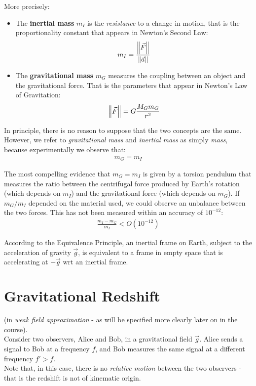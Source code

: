 \documentclass[../template.tex]{subfiles}
\begin{document}
More precisely:
\begin{itemize}
    \item The \textbf{inertial mass} $m_I$  is the \textit{resistance} to a change in motion, that is the proportionality constant that appears in Newton's Second Law:
    \begin{align*}
        m_I = \frac{\norm{\vec{F}}}{\norm{\vec{a}}}  
    \end{align*}  
    \item The \textbf{gravitational mass} $m_G$  measures the coupling between an object and the gravitational force. That is the parameters that appear in Newton's Law of Gravitation:
    \begin{align*}
        \norm{\vec{F}} = G \frac{M_G m_G}{r^2}
    \end{align*} 
\end{itemize}
In principle, there is no reason to suppose that the two concepts are the same. However, we refer to \textit{gravitational mass} and \textit{inertial mass} as simply \textit{mass}, because experimentally we observe that:
\begin{align*}
    m_G = m_I
\end{align*}   

The most compelling evidence that $m_G = m_I$ is given by a torsion pendulum that measures the ratio between the centrifugal force produced by Earth's rotation (which depends on $m_I$) and the gravitational force (which depends on $m_G$). If $m_G/m_I$ depended on the material used, we could observe an unbalance between the two forces. This has not been measured within an accuracy of $10^{-12}$:
\begin{align*}
    \frac{m_I - m_G}{m_I} < O(10^{-12}) 
\end{align*}   

According to the Equivalence Principle, an inertial frame on Earth, subject to the acceleration of gravity $\vec{g}$, is equivalent to a frame in empty space that is accelerating at $-\vec{g}$ wrt an inertial frame. 

\section{Gravitational Redshift}
(in \textit{weak field approximation} - as will be specified more clearly later on in the course).\\

Consider two observers, Alice and Bob, in a gravitational field $\vec{g}$. Alice sends a signal to Bob at a frequency $f$, and Bob measures the same signal at a different frequency $f' > f$.\\
Note that, in this case, there is no \textit{relative motion} between the two observers - that is the redshift is not of kinematic origin.\\
\end{document}
